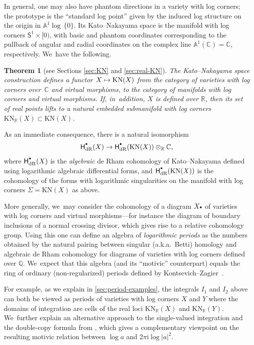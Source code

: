 \documentclass[10pt]{amsart}
\let\oldbullet\bullet
\renewcommand{\bullet}{{\raisebox{1pt}{$\scriptscriptstyle\oldbullet$}}}
\newcommand\mto{\mathchoice{\longmapsto}{\mapsto}{\mapsto}{\mapsto}}
\newtheorem{theorem}{Theorem}[section]
\theoremstyle{definition}
\theoremstyle{remark}
\let\defn\emph
\newcommand{\CC}{\mathbb{C}}
\newcommand{\RR}{\mathbb{R}}
\newcommand{\QQ}{\mathbb{Q}}
\newcommand{\AF}{\mathbb{A}}
\newcommand{\logcyl}{\AF^1 \log\, \{0\}}
\newcommand{\iu}{\mathrm{i}}
\newcommand{\rbrac}[1]{\left(#1\right)}
\newcommand{\Sig}{\Sigma}
\newcommand{\KN}[1]{\mathrm{KN}(#1)}
\newcommand{\KNR}[1]{\mathrm{KN}_\RR\rbrac{#1}}
\newcommand{\HdR}[2][\bullet]{\mathsf{H}_{\mathrm{dR}}^{#1}(#2)}
\newcommand{\unitcirc}{\mathsf{S}^{1}}
\begin{document}
In general, one may also have phantom directions in a variety with log corners; the prototype is the ``standard log point'' given by the induced log structure on the origin in $\logcyl$. Its Kato--Nakayama space is the manifold with log corners $\unitcirc \times [0)$, with basic and phantom coordinates corresponding to the pullback of angular and radial coordinates on the complex line $\AF^1(\CC) = \CC$, respectively. We~have the following.

\begin{theorem}[see Sections \ref{sec:KN} and \ref{sec:real-KN}]
The Kato--Nakayama space construction defines a functor $X \mto \KN{X}$ from the category of varieties with log corners over~$\CC$ and virtual morphisms, to the category of manifolds with log corners and virtual morphisms. If, in~addition, $X$ is defined over $\RR$, then its set of real points lifts to a natural embedded submanifold with log corners $\KNR{X}\subset \KN{X}$.
\end{theorem}

As an immediate consequence, there is a natural isomorphism
\[
\HdR{X} \to \HdR{\KN{X}}\otimes_\RR \CC,
\]
where $\HdR{X}$ is the \emph{algebraic} de Rham cohomology of Kato--Nakayama \cite{KatoNakayama} defined using logarithmic algebraic differential forms, and $\HdR{\KN{X}}$ is the cohomology of the forms with logarithmic singularities on the manifold with log corners $\Sig=\KN{X}$ as above.

More generally, we~may consider the cohomology of a diagram $X_\bullet$ of varieties with log corners and virtual morphisms---for instance the diagram of boundary inclusions of a normal crossing divisor, which gives rise to a relative cohomology group. Using this one can define an algebra of \defn{logarithmic periods} as the numbers obtained by the natural pairing between singular (a.k.a.~Betti) homology and algebraic de Rham cohomology for diagrams of varieties with log corners defined over $\QQ$. We~expect that this algebra (and its ``motivic'' counterpart) equals the ring of ordinary (non-regularized) periods defined by Kontsevich--Zagier~\cite{KontsevichZagier}.

For example, as we explain in \autoref{sec:period-examples}, the integrals $I_1$ and $I_2$ above can both be viewed as periods of varieties with log corners $X$ and $Y$ where the domains of integration are cells of the real loci $\KNR{X}$ and $\KNR{Y}$. We~further explain an alternative approach to the single-valued integration and the double-copy formula from \cite{BrownDupont}, which gives a complementary viewpoint on the resulting motivic relation between $\log a$ and $2\pi\iu \log |a|^2$.
\end{document}
